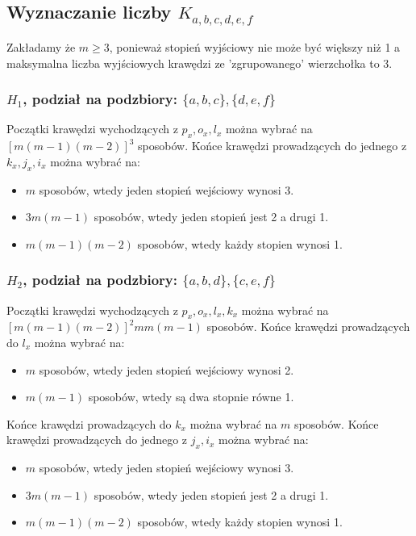 \documentclass{article}
\begin{document}
\subsection{Wyznaczanie liczby $K_{a,b,c,d,e,f}$}
Zakładamy że $m \geq 3$, ponieważ stopień wyjściowy nie może być większy niż 1 a maksymalna liczba wyjściowych krawędzi ze 'zgrupowanego' wierzchołka to 3.

\subsubsection{$H_1$, podział na podzbiory: $\{ a,b,c \}, \{ d,e,f \}$}
Początki krawędzi wychodzących z $p_x, o_x, l_x$ można wybrać na $[m(m-1)(m-2)]^3$ sposobów.
Końce krawędzi prowadzących do jednego z $k_x, j_x, i_x$ można wybrać na:
\begin{itemize}
  \item $m$ sposobów, wtedy jeden stopień wejściowy wynosi 3.
  \item $3m(m-1)$ sposobów, wtedy jeden stopień jest 2 a drugi 1.
  \item $m(m-1)(m-2)$ sposobów, wtedy każdy stopien wynosi 1.
\end{itemize}

\subsubsection{$H_2$, podział na podzbiory: $\{ a,b,d \}, \{ c,e,f \}$}
Początki krawędzi wychodzących z $p_x, o_x, l_x, k_x$ można wybrać na $[m(m-1)(m-2)]^2mm(m-1)$ sposobów.
Końce krawędzi prowadzących do $l_x$ można wybrać na:
\begin{itemize}
  \item $m$ sposobów, wtedy jeden stopień wejściowy wynosi 2.
  \item $m(m-1)$ sposobów, wtedy są dwa stopnie równe 1.
\end{itemize}
Końce krawędzi prowadzących do $k_x$ można wybrać na $m$ sposobów.
Końce krawędzi prowadzących do jednego z $j_x, i_x$ można wybrać na:
\begin{itemize}
  \item $m$ sposobów, wtedy jeden stopień wejściowy wynosi 3.
  \item $3m(m-1)$ sposobów, wtedy jeden stopień jest 2 a drugi 1.
  \item $m(m-1)(m-2)$ sposobów, wtedy każdy stopien wynosi 1.
\end{itemize}
\end{document}
